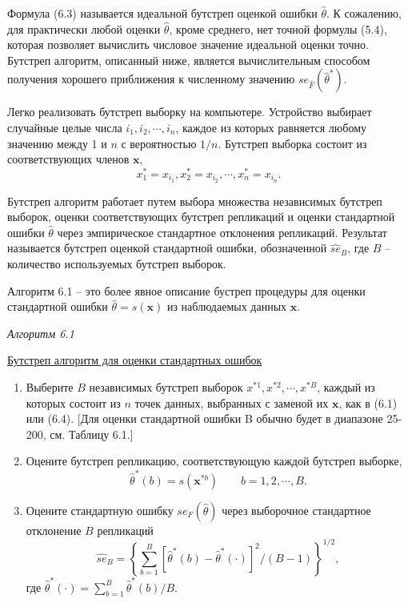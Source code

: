 Формула (6.3) называется идеальной бутстреп оценкой ошибки $\hat\theta$. К сожалению, для практически любой оценки $\hat\theta$, кроме среднего, нет точной формулы (5.4), которая позволяет вычислить числовое значение идеальной оценки точно. Бутстреп алгоритм, описанный ниже, является вычислительным способом получения хорошего приближения к численному значению $se_{\hat F} (\hat\theta^*)$. 

Легко реализовать бутстреп выборку на компьютере. Устройство выбирает случайные целые числа $i_1, i_2, \cdots, i_n$, каждое из которых равняется любому значению между 1 и $n$ с вероятностью $1 / n$. Бутстреп выборка состоит из соответствующих членов $\mathbf{x}$,
\begin{equation}
    x_1^*=x_{i_1},x_2^*=x_{i_2},\cdots,x_n^*=x_{i_n}.
\end{equation}

Бутстреп алгоритм работает путем выбора множества независимых бутстреп выборок, оценки соответствующих бутстреп репликаций и оценки стандартной ошибки $\hat\theta$ через эмпирическое стандартное отклонения репликаций. Результат называется бутстреп оценкой стандартной ошибки, обозначенной $\widehat{se}_B$, где $B$ -- количество используемых бутстреп выборок.

Алгоритм 6.1 -- это более явное описание бустреп процедуры для оценки стандартной ошибки $\hat\theta=s(\mathbf{x})$ из наблюдаемых данных $\mathbf{x}$. 

\newpage
\begin{center}
    \textit{Алгоритм 6.1}
    
    \underline{Бутстреп алгоритм для оценки стандартных ошибок}
    
    \begin{enumerate}
        \item Выберите $B$ независимых бутстреп выборок $x^{*1}, x^{*2},\cdots, x^{*B}$, каждый из которых состоит из $n$ точек данных, выбранных с заменой их $\mathbf{x}$, как в (6.1) или (6.4). [Для оценки стандартной ошибки B обычно будет в диапазоне 25-200, см. Таблицу 6.1.] 
        
        \item Оцените бутстреп репликацию, соответствующую каждой бутстреп выборке,
        \begin{equation}
            \hat\theta^*(b)=s(\mathbf{x}^{*b})\qquad b=1,2,\cdots,B.
        \end{equation}
        
        \item Оцените стандартную ошибку $se_F (\hat\theta)$ через выборочное стандартное отклонение $B$ репликаций 
        \begin{equation}
            \widehat{se}_B=\left\{\sum_{b=1}^B[\hat\theta^*(b)-\hat\theta^*(\cdot)]^2/(B-1)\right\}^{1/2},
        \end{equation}
        где $\hat\theta^*(\cdot)=\sum_{b=1}^B\hat\theta^*(b)/B$.
    \end{enumerate}
\end{center}

